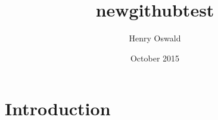 \documentclass{article}
\title{newgithubtest}
\author{Henry Oswald}
\date{October 2015}
\begin{document}
\maketitle

\section{Introduction}
\end{document}
